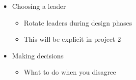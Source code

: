 \begin{itemize}
\begin{itemize}
\begin{itemize}
        \end{itemize}

      \item Choosing a leader

        \begin{itemize}

          \item Rotate leaders during design phases

          \item This will be explicit in project 2

        \end{itemize}

      \item Making decisions

        \begin{itemize}

          \item What to do when you disagree
            
        \end{itemize}

    \end{itemize}

\end{itemize}



